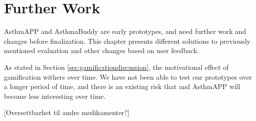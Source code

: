 \chapter{Further Work}
\label{chp:futurework}

AsthmAPP and AsthmaBuddy are early prototypes, and need further work and changes before finalization. This chapter presents different solutions to previously mentioned evaluation and other changes based on user feedback.

As stated in Section \ref{sec:gamificationdiscussion}, the motivational effect of gamification withers over time. We have not been able to test our prototypes over a longer period of time, and there is an existing risk that \buddy{} and AsthmAPP will become less interesting over time. 


[Oversettbarhet til andre medikamenter?]